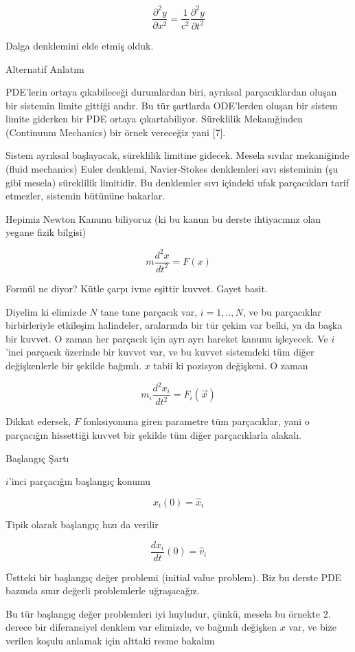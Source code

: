 \documentclass[12pt,fleqn]{article}\usepackage{../../common}
\begin{document}
$$
\frac{\partial^2 y}{\partial x^2}  =
\frac{1}{c^2}\frac{\partial^2 y}{\partial t^2}
$$

Dalga denklemini elde etmiş olduk.

Alternatif Anlatım

PDE'lerin ortaya çıkabileceği durumlardan biri, ayrıksal parçacıklardan oluşan
bir sistemin limite gittiği andır. Bu tür şartlarda ODE'lerden oluşan bir sistem
limite giderken bir PDE ortaya çıkartabiliyor. Süreklilik Mekanığinden
(Continuum Mechanics) bir örnek vereceğiz yani [7].

Sistem ayrıksal başlayacak, süreklilik limitine gidecek. Mesela sıvılar
mekaniğinde (fluid mechanics) Euler denklemi, Navier-Stokes denklemleri sıvı
sisteminin (şu gibi mesela) süreklilik limitidir. Bu denklemler sıvı içindeki
ufak parçacıkları tarif etmezler, sistemin bütününe bakarlar.

Hepimiz Newton Kanunu biliyoruz (ki bu kanun bu derste ihtiyacımız olan
yegane fizik bilgisi)

$$ m \frac{d^2x}{dt^2} = F(x) $$

Formül ne diyor? Kütle çarpı ivme eşittir kuvvet. Gayet basit.

Diyelim ki elimizde $N$ tane tane parçacık var, $i=1,..,N$, ve bu
parçacıklar birbirleriyle etkileşim halindeler, aralarında bir tür çekim
var belki, ya da başka bir kuvvet. O zaman her parçacık için ayrı ayrı
hareket kanunu işleyecek. Ve $i$'inci parçacık üzerinde bir kuvvet var, ve
bu kuvvet sistemdeki tüm diğer değişkenlerle bir şekilde bağımlı. $x$ tabii
ki pozisyon değişkeni. O zaman

$$ m_i \frac{d^2x_i}{dt^2} = F_i(\vec{x}) $$

Dikkat edersek, $F$ fonksiyonuna giren parametre tüm parçacıklar, yani o
parçacığın hissettiği kuvvet bir şekilde tüm diğer parçacıklarla alakalı. 

Başlangıç Şartı

$i$'inci parçacığın başlangıç konumu

$$ x_i(0) = \hat{x}_i $$

Tipik olarak başlangıç hızı da verilir

$$ \frac{dx_i}{dt}(0) = \hat{v}_i $$

Üstteki bir başlangıç değer problemi (initial value problem). Biz bu derste
PDE bazında sınır değerli problemlerle uğraşacağız. 

Bu tür başlangıç değer problemleri iyi huyludur, çünkü, mesela bu örnekte
2. derece bir diferansiyel denklem var elimizde, ve bağımlı değişken $x$
var, ve bize verilen koşulu anlamak için alttaki resme bakalım
\end{document}
